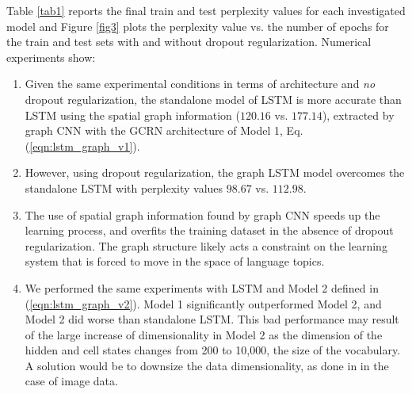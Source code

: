 \documentclass{article} %
\newcommand{\eqnref}[1]{(\ref{eqn:#1})}
\begin{document}
\noindent
Table \ref{tab1} reports the final train and test perplexity values for each investigated model and Figure \ref{fig3} plots the perplexity value vs. the number of epochs for the train and test sets with and without dropout regularization. Numerical experiments show:
\vspace{-0.25cm}
\begin{enumerate}
\item Given the same experimental conditions in terms of architecture and {\it no} dropout regularization, the standalone model of LSTM is more accurate than LSTM using the spatial graph information ($120.16$ vs. $177.14$), extracted by graph CNN with the GCRN architecture of Model 1, Eq. \eqnref{lstm_graph_v1}. 
\item However, using dropout regularization, the graph LSTM model overcomes the standalone LSTM with perplexity values $98.67$ vs. $112.98$. 
\item The use of spatial graph information found by graph CNN speeds up the learning process, and overfits the training dataset in the absence of dropout regularization. The graph structure likely acts a constraint on the learning system that is forced to move in the space of language topics.
\item We performed the same experiments with LSTM and Model 2 defined in \eqnref{lstm_graph_v2}. Model 1 significantly outperformed Model 2, and Model 2 did worse than standalone LSTM. This bad performance may result of the large increase of dimensionality in Model 2 as the dimension of the hidden and cell states changes from 200 to 10,000, the size of the vocabulary. A solution would be to downsize the data dimensionality, as done in \cite{convlstm} in the case of image data.
\end{enumerate}












\end{document}

